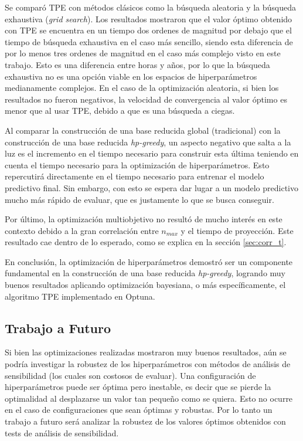 
Se comparó TPE con métodos clásicos como la búsqueda aleatoria y la búsqueda exhaustiva (\textit{grid search}). Los resultados mostraron que el valor óptimo obtenido con TPE se encuentra en un tiempo dos ordenes de magnitud por debajo que el tiempo de búsqueda exhaustiva en el caso más sencillo, siendo esta diferencia de por lo menos tres ordenes de magnitud en el caso más complejo visto en este trabajo. Esto es una diferencia entre horas y años, por lo que la búsqueda exhaustiva no es una opción viable en los espacios de hiperparámetros medianamente complejos. En el caso de la optimización aleatoria, si bien los resultados no fueron negativos, la velocidad de convergencia al valor óptimo es menor que al usar TPE, debido a que es una búsqueda a ciegas.


Al comparar la construcción de una base reducida global (tradicional) con la construcción de una base reducida \textit{hp-greedy}, un aspecto negativo que salta a la luz es el incremento en el tiempo necesario para construir esta última teniendo en cuenta el tiempo necesario para la optimización de hiperparámetros. Esto repercutirá directamente en el tiempo necesario para entrenar el modelo predictivo final. Sin embargo, con esto se espera dar lugar a un modelo predictivo mucho más rápido de evaluar, que es justamente lo que se busca conseguir.


Por último, la optimización multiobjetivo no resultó de mucho interés en este contexto debido a la gran correlación entre $n_{max}$ y el tiempo de proyección. Este resultado cae dentro de lo esperado, como se explica en la sección \ref{sec:corr_t}.


En conclusión, la optimización de hiperparámetros demostró ser un componente fundamental en la construcción de una base reducida \textit{hp-greedy}, logrando muy buenos resultados aplicando optimización bayesiana, o más específicamente, el algoritmo TPE implementado en Optuna.

\subsection*{Trabajo a Futuro}


Si bien las optimizaciones realizadas mostraron muy buenos resultados, aún se podría investigar la robustez de los hiperparámetros con métodos de análisis de sensibilidad (los cuales son costosos de evaluar). Una configuración de hiperparámetros puede ser óptima pero inestable, es decir que se pierde la optimalidad al desplazarse un valor tan pequeño como se quiera. Esto no ocurre en el caso de configuraciones que sean óptimas y robustas. Por lo tanto un trabajo a futuro será analizar la robustez de los valores óptimos obtenidos con tests de análisis de sensibilidad.

